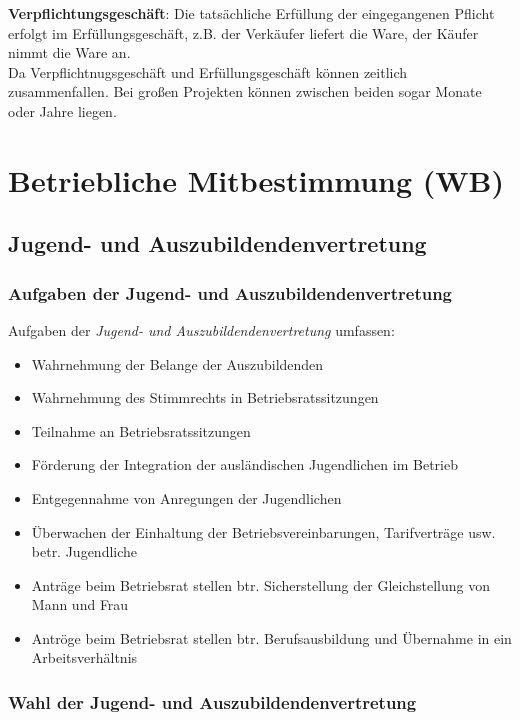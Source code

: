 \documentclass[a4paper, 12pt]{report}
\begin{document}
\textbf{Verpflichtungsgeschäft}: Die tatsächliche Erfüllung der eingegangenen
Pflicht erfolgt im Erfüllungsgeschäft, z.B. der Verkäufer liefert die Ware,
der Käufer nimmt die Ware an. \\

Da Verpflichtnugsgeschäft und Erfüllungsgeschäft können zeitlich zusammenfallen.
Bei großen Projekten können zwischen beiden sogar Monate oder Jahre liegen.

\section{Betriebliche Mitbestimmung (WB)}

\subsection{Jugend- und Auszubildendenvertretung}

\subsubsection{Aufgaben der Jugend- und Auszubildendenvertretung}

Aufgaben der \emph{Jugend- und Auszubildendenvertretung} umfassen:

\begin{itemize}
    \item Wahrnehmung der Belange der Auszubildenden
    \item Wahrnehmung des Stimmrechts in Betriebsratssitzungen
    \item Teilnahme an Betriebsratssitzungen
    \item Förderung der Integration der ausländischen Jugendlichen im Betrieb
    \item Entgegennahme von Anregungen der Jugendlichen
    \item Überwachen der Einhaltung der Betriebsvereinbarungen, Tarifverträge
	usw. betr. Jugendliche
    \item Anträge beim Betriebsrat stellen btr. Sicherstellung der
	Gleichstellung von Mann und Frau
    \item Antröge beim Betriebsrat stellen btr. Berufsausbildung und Übernahme
	in ein Arbeitsverhältnis
\end{itemize}

\subsubsection{Wahl der Jugend- und Auszubildendenvertretung}
\end{document}
